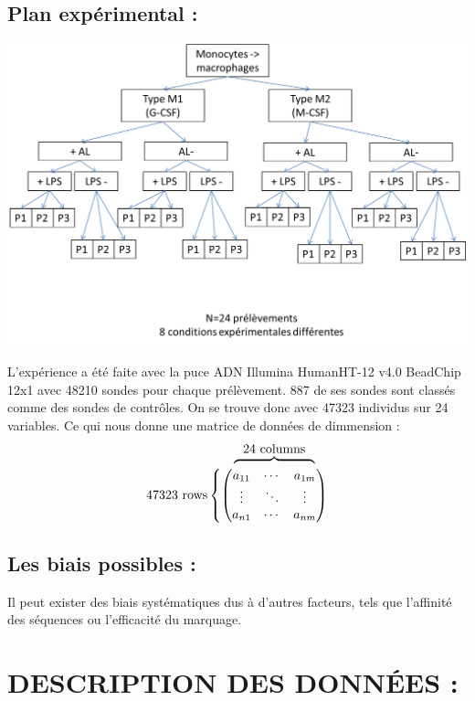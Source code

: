 \documentclass[a4paper,10pt]{article}
\begin{document}
\subsection{ Plan expérimental :}
\begin{center}
 \includegraphics[scale=0.5]{./image/plan.png}
\end{center}
L’expérience a été faite avec la puce ADN  Illumina HumanHT-12 v4.0 BeadChip 12x1 avec 48210 sondes pour chaque prélèvement.
887 de ses sondes sont classés comme des sondes de contrôles.
On se trouve donc avec 47323 individus sur 24 variables. 
Ce qui nous donne une matrice de données de dimmension :
\def\tmp{
  \begin{pmatrix}
  a_{11} & \cdots & a_{1m} \\

   \vdots & \ddots &\vdots \\

   a_{n1} & \cdots & a_{nm} 
 \end{pmatrix}
}
\[
\stackMath\def\stackalignment{r}
  \stackon
    {\mathrm{47323~rows}\left\{\tmp\right.}
    {\overbrace{\phantom{\smash{\tmp\mkern -36mu}}}^{\mathrm{\textstyle 24~columns}}\mkern 20mu}
\]

\subsection{Les biais possibles :}
 Il peut exister des biais systématiques dus à d'autres facteurs,
  tels que l'affinité des séquences ou l'efficacité du marquage. 
\section{DESCRIPTION DES DONN\'{E}ES :}
\end{document}
